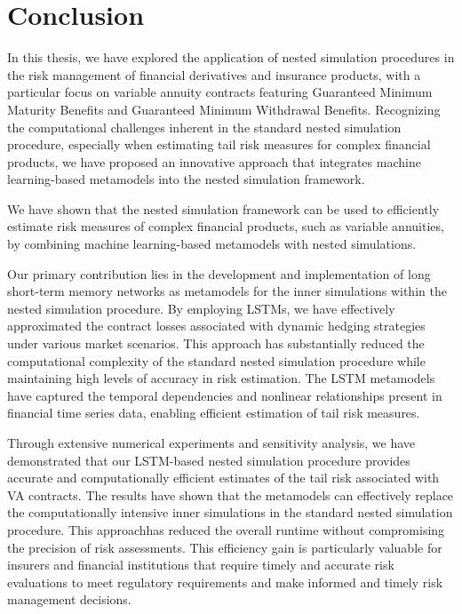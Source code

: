 \chapter{Conclusion} \label{chap:conclusion}

In this thesis, we have explored the application of nested simulation procedures in the risk management of financial derivatives and insurance products, with a particular focus on variable annuity contracts featuring Guaranteed Minimum Maturity Benefits and Guaranteed Minimum Withdrawal Benefits. 
Recognizing the computational challenges inherent in the standard nested simulation procedure, especially when estimating tail risk measures for complex financial products, we have proposed an innovative approach that integrates machine learning-based metamodels into the nested simulation framework.

We have shown that the nested simulation framework can be used to efficiently estimate risk measures of complex financial products, such as variable annuities, by combining machine learning-based metamodels with nested simulations.

Our primary contribution lies in the development and implementation of long short-term memory networks as metamodels for the inner simulations within the nested simulation procedure. 
By employing LSTMs, we have effectively approximated the contract losses associated with dynamic hedging strategies under various market scenarios. 
This approach has substantially reduced the computational complexity of the standard nested simulation procedure while maintaining high levels of accuracy in risk estimation. 
The LSTM metamodels have captured the temporal dependencies and nonlinear relationships present in financial time series data, enabling efficient estimation of tail risk measures.

Through extensive numerical experiments and sensitivity analysis, we have demonstrated that our LSTM-based nested simulation procedure provides accurate and computationally efficient estimates of the tail risk associated with VA contracts. 
The results have shown that the metamodels can effectively replace the computationally intensive inner simulations in the standard nested simulation procedure.
This approachhas reduced the overall runtime without compromising the precision of risk assessments.
This efficiency gain is particularly valuable for insurers and financial institutions that require timely and accurate risk evaluations to meet regulatory requirements and make informed and timely risk management decisions.

